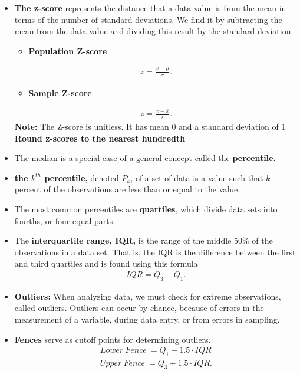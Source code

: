 \documentclass{report}
\begin{document}
         \begin{itemize}
             \item \textbf{The z-score} represents the distance that a data value is from the mean in terms of the number of standard deviations. We find it by subtracting the mean from the data value and dividing this result by the standard deviation.
                 \begin{itemize}
                     \item \textbf{Population Z-score}
                 \end{itemize}
                 \begin{align*}
                      z = \frac{x - \mu}{\sigma}
                 .\end{align*}
                 \begin{itemize}
                     \item \textbf{Sample Z-score}
                 \end{itemize}
                 \begin{align*}
                     z =\frac{x-\overline{x}}{s}
                 .\end{align*}
                 \textbf{Note:} The Z-score is unitless. It has mean  0 and a standard deviation of 1 \\
                 \textbf{Round z-scores to the nearest hundredth}
             \item  The median is a special case of a general concept called the \textbf{percentile.}
             \item \textbf{the $k^{th}$  percentile,} denoted $P_{k} $,  of a set of data is a value such that $k $  percent of the observations are less than or equal to the value.
                \item The most common percentiles are \textbf{quartiles}, which divide data sets into fourths, or four equal parts.
                \item The \textbf{interquartile range, IQR,} is the range of the middle $50\% $  of the observations in a data set. That is, the IQR is the difference between the first and third quartiles and is found using this formula  
                    \begin{align*}
                        IQR = Q_{3} - Q_{1}
                    .\end{align*}
                \item \textbf{Outliers:} When analyzing data, we must check for extreme observations, called outliers. Outliers can occur by chance, because of errors in the measurement of a variable, during data entry, or from errors in sampling.
                \item \textbf{Fences} serve as cutoff points for determining outliers.
                    \begin{align*}
                        Lower\ Fence\ = Q_{1} - 1.5\cdot IQR \\
                        Upper\ Fence\ = Q_{3} + 1.5\cdot IQR
                    .\end{align*}


         \end{itemize}
\end{document}
